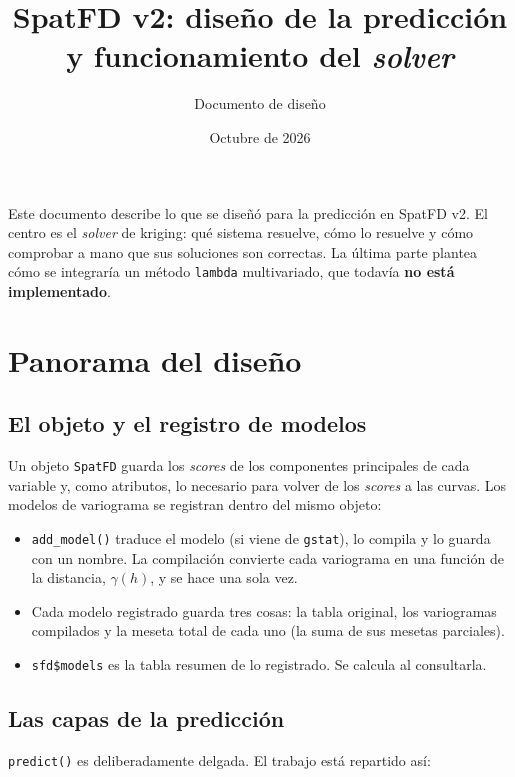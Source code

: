 \documentclass[11pt,a4paper]{article}
\title{SpatFD v2: diseño de la predicción y funcionamiento del \emph{solver}}
\author{Documento de diseño}
\date{Octubre de 2026}
\newcommand{\code}[1]{\texttt{#1}}
\begin{document}
\maketitle

\noindent
Este documento describe lo que se diseñó para la predicción en SpatFD v2. El
centro es el \emph{solver} de kriging: qué sistema resuelve, cómo lo resuelve
y cómo comprobar a mano que sus soluciones son correctas. La última parte
plantea cómo se integraría un método \code{lambda} multivariado, que todavía
\textbf{no está implementado}.

\tableofcontents

\section{Panorama del diseño}

\subsection{El objeto y el registro de modelos}

Un objeto \code{SpatFD} guarda los \emph{scores} de los componentes
principales de cada variable y, como atributos, lo necesario para volver de
los \emph{scores} a las curvas. Los modelos de variograma se registran dentro
del mismo objeto:

\begin{itemize}
  \item \code{add\_model()} traduce el modelo (si viene de \code{gstat}), lo
        compila y lo guarda con un nombre. La compilación convierte cada
        variograma en una función de la distancia, $\gamma(h)$, y se hace una
        sola vez.
  \item Cada modelo registrado guarda tres cosas: la tabla original, los
        variogramas compilados y la meseta total de cada uno (la suma de sus
        mesetas parciales).
  \item \code{sfd\$models} es la tabla resumen de lo registrado. Se calcula al
        consultarla.
\end{itemize}

\subsection{Las capas de la predicción}

\code{predict()} es deliberadamente delgada. El trabajo está repartido así:
\end{document}
